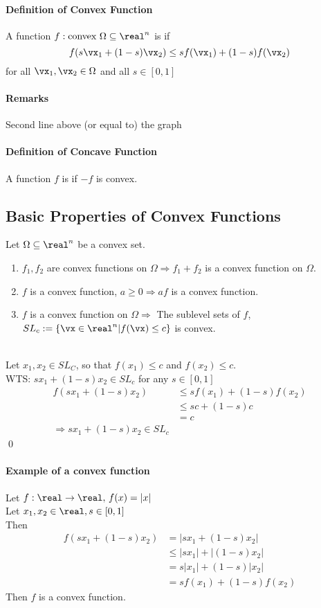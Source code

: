 \documentclass[11pt]{article}
\begin{document}
\paragraph{Definition of Convex Function}
A function $f: \text{convex } \Omega \subseteq \real^n$ is  if 
$$f(s\vx_1 + (1-s)\vx_2) \leq sf(\vx_1) + (1-s)f(\vx_2)$$
for all $\vx_1, \vx_2 \in \Omega$ and all $s \in [0, 1]$
\paragraph{Remarks}
Second line above (or equal to) the graph
\paragraph{Definition of Concave Function}
A function $f$ is  if $-f$ is convex.

\subsection{Basic Properties of Convex Functions}
Let $\Omega \subseteq \real^n$ be a convex set.
\begin{enumerate}
	\item $f_1, f_2$ are convex functions on $\Omega \Rightarrow f_1 + f_2$ is a convex function on $\Omega$.
	\item $f$ is a convex function, $a \geq 0 \Rightarrow af$ is a convex function.
	\item $f$ is a convex function on $\Omega \Rightarrow$ The sublevel sets of $f$, $SL_c:=\{\vx \in \real^n | f(\vx) \leq c\}$ is convex.
\end{enumerate}
 \\
Let $x_1, x_2 \in SL_C$, so that $f(x_1) \leq c$ and $f(x_2) \leq c$. \\
WTS: $sx_1 + (1-s)x_2 \in SL_c$ for any $s \in [0,1]$
\begin{align*}
	f(sx_1 + (1-s)x_2) &\leq sf(x_1) + (1-s)f(x_2) \tag{$f$ is convex}\\
	&\leq sc + (1-s)c \\
	&= c \\
\Rightarrow sx_1 + (1-s)x_2 \in SL_c
\end{align*}
\qed

\paragraph{Example of a convex function}
Let $f: \real \rightarrow \real, \,f(x) = |x|$ \\
Let $x_1, x_2 \in \real, s \in [0,1]$ \\
Then
\begin{align*}
	f(sx_1 + (1-s)x_2) &= |sx_1 + (1-s)x_2| \\
	&\leq |sx_1| + |(1-s)x_2| \tag{by Triangle Inequality}\\
	&= s|x_1| + (1-s)|x_2| \\
	&= sf(x_1) + (1-s)f(x_2)
\end{align*}
Then $f$ is a convex function.
\end{document}
